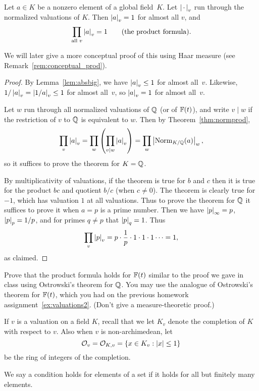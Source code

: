 \begin{theorem}\label{thm:product_formula}
Let $a\in K$ be a nonzero element of a global field~$K$.
Let $\left|\,\cdot\,\right|_v$ run through the normalized valuations
of $K$.  Then $\left|a\right|_v=1$ for almost all $v$, and
$$
\prod_{\text{\rm all }v} \left|a\right|_v = 1\qquad{\text{\rm (the product
    formula).}}
$$
\end{theorem}
We will later give a more conceptual proof of this
using Haar measure (see Remark~\ref{rem:conceptual_prod}).
\begin{proof}
By Lemma~\ref{lem:absbig}, we have $\left|a\right|_v\leq 1$
for almost all~$v$.  Likewise, $1/\left|a\right|_v = \left|1/a\right|_v\leq 1$
for almost all~$v$, so $\left|a\right|_v = 1$ for almost all~$v$.

Let $w$ run through all normalized valuations of $\mathbb{Q}$ (or of $\mathbb{F}(t)$),
and write $v\mid w$ if the restriction of $v$ to $\mathbb{Q}$ is equivalent to $w$.
Then by Theorem~\ref{thm:normprod},
$$
 \prod_{v} \left|a\right|_v = \prod_w \left(\prod_{v\mid w} \left|a\right|_v\right)
     = \prod_w \left|\operatorname{Norm}_{K/\mathbb{Q}}(a)\right|_w,
$$
so it suffices to prove the theorem for $K=\mathbb{Q}$.

By multiplicativity of valuations, if the theorem is true for $b$ and
$c$ then it is true for the product $b c$ and quotient $b/c$ (when
$c\neq 0$). The theorem is clearly true for $-1$, which has valuation
$1$ at all valuations.  Thus to prove the theorem for $\mathbb{Q}$ it suffices
to prove it when $a=p$ is a prime number.  Then we have
$\left|p\right|_\infty = p$, $\left|p\right|_p = 1/p$, and for primes $q\neq p$ that
$\left|p\right|_q = 1$.  Thus
$$\prod_v \left|p\right|_v = p \cdot \frac{1}{p} \cdot 1 \cdot 1 \cdot 1 \cdots = 1,$$
as claimed.
\end{proof}
\begin{exercise}\label{ex:adeles1}
  Prove that the product formula holds for $\mathbb{F}(t)$ similar to the
  proof we gave in class using Ostrowski's theorem for $\mathbb{Q}$.  You may
  use the analogue of Ostrowski's theorem for $\mathbb{F}(t)$, which you had
  on the previous homework assignment~\ref{ex:valuations2}.
  (Don't give a measure-theoretic proof.)
\end{exercise}

If $v$ is a valuation on a field $K$, recall that
we let $K_v$ denote the completion of $K$ with respect to $v$. Also when
$v$ is non-archimedean, let
$$
  \mathcal{O}_v = \mathcal{O}_{K,v} = \{x \in K_v : \left|x\right| \leq 1\}
$$
be the ring of integers of the completion.

\begin{definition}
We say a condition holds for  elements
of a set if it holds for all but finitely many elements.
\end{definition}

